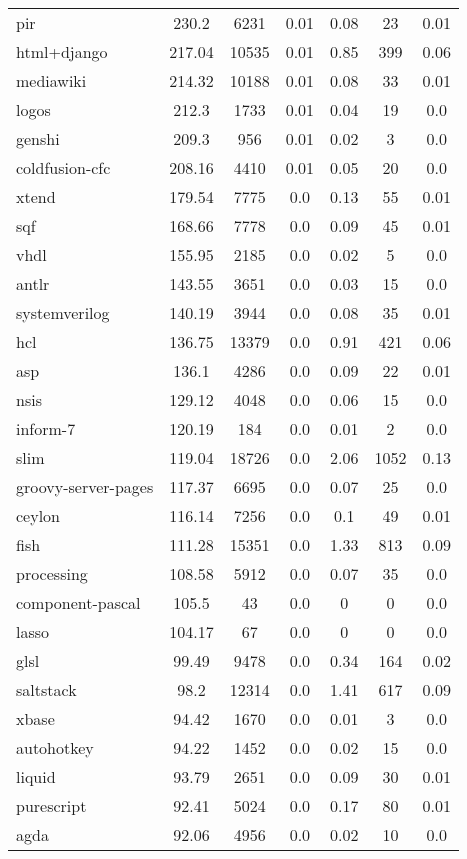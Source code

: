 \begin{longtable}{l|ccc|ccc}
pir & 230.2 & 6231 & 0.01 & 0.08 & 23 & 0.01 \\
html+django & 217.04 & 10535 & 0.01 & 0.85 & 399 & 0.06 \\
mediawiki & 214.32 & 10188 & 0.01 & 0.08 & 33 & 0.01 \\
logos & 212.3 & 1733 & 0.01 & 0.04 & 19 & 0.0 \\
genshi & 209.3 & 956 & 0.01 & 0.02 & 3 & 0.0 \\
coldfusion-cfc & 208.16 & 4410 & 0.01 & 0.05 & 20 & 0.0 \\
xtend & 179.54 & 7775 & 0.0 & 0.13 & 55 & 0.01 \\
sqf & 168.66 & 7778 & 0.0 & 0.09 & 45 & 0.01 \\
vhdl & 155.95 & 2185 & 0.0 & 0.02 & 5 & 0.0 \\
antlr & 143.55 & 3651 & 0.0 & 0.03 & 15 & 0.0 \\
systemverilog & 140.19 & 3944 & 0.0 & 0.08 & 35 & 0.01 \\
hcl & 136.75 & 13379 & 0.0 & 0.91 & 421 & 0.06 \\
asp & 136.1 & 4286 & 0.0 & 0.09 & 22 & 0.01 \\
nsis & 129.12 & 4048 & 0.0 & 0.06 & 15 & 0.0 \\
inform-7 & 120.19 & 184 & 0.0 & 0.01 & 2 & 0.0 \\
slim & 119.04 & 18726 & 0.0 & 2.06 & 1052 & 0.13 \\
groovy-server-pages & 117.37 & 6695 & 0.0 & 0.07 & 25 & 0.0 \\
ceylon & 116.14 & 7256 & 0.0 & 0.1 & 49 & 0.01 \\
fish & 111.28 & 15351 & 0.0 & 1.33 & 813 & 0.09 \\
processing & 108.58 & 5912 & 0.0 & 0.07 & 35 & 0.0 \\
component-pascal & 105.5 & 43 & 0.0 & 0 & 0 & 0.0 \\
lasso & 104.17 & 67 & 0.0 & 0 & 0 & 0.0 \\
glsl & 99.49 & 9478 & 0.0 & 0.34 & 164 & 0.02 \\
saltstack & 98.2 & 12314 & 0.0 & 1.41 & 617 & 0.09 \\
xbase & 94.42 & 1670 & 0.0 & 0.01 & 3 & 0.0 \\
autohotkey & 94.22 & 1452 & 0.0 & 0.02 & 15 & 0.0 \\
liquid & 93.79 & 2651 & 0.0 & 0.09 & 30 & 0.01 \\
purescript & 92.41 & 5024 & 0.0 & 0.17 & 80 & 0.01 \\
agda & 92.06 & 4956 & 0.0 & 0.02 & 10 & 0.0 \\

\end{longtable}
